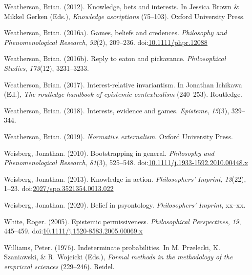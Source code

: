 \documentclass[
  10pt,
  letterpaper,
  twoside]{scrbook}
\newlength{\cslhangindent}
\newenvironment{CSLReferences}[2] %
 {\begin{list}{}{%
  \setlength{\itemindent}{0pt}
  \setlength{\leftmargin}{0pt}
  \setlength{\parsep}{0pt}
  \ifodd #1
   \setlength{\leftmargin}{\cslhangindent}
   \setlength{\itemindent}{-1\cslhangindent}
  \fi
  \setlength{\itemsep}{#2\baselineskip}}}
 {\end{list}}
\begin{document}
\begin{CSLReferences}{1}{0}
Weatherson, Brian. (2012). Knowledge, bets and interests. In Jessica
Brown \& Mikkel Gerken (Eds.), \emph{Knowledge ascriptions} (75--103).
Oxford University Press.

Weatherson, Brian. (2016a). Games, beliefs and credences.
\emph{Philosophy and Phenomenological Research}, \emph{92}(2), 209--236.
doi:\href{https://doi.org/10.1111/phpr.12088}{10.1111/phpr.12088}

Weatherson, Brian. (2016b). Reply to eaton and pickavance.
\emph{Philosophical Studies}, \emph{173}(12), 3231--3233.

Weatherson, Brian. (2017). Interest-relative invariantism. In Jonathan
Ichikawa (Ed.), \emph{The routledge handbook of epistemic contextualism}
(240--253). Routledge.

Weatherson, Brian. (2018). Interests, evidence and games.
\emph{Episteme}, \emph{15}(3), 329--344.

Weatherson, Brian. (2019). \emph{Normative externalism}. Oxford
University Press.

Weisberg, Jonathan. (2010). Bootstrapping in general. \emph{Philosophy
and Phenomenological Research}, \emph{81}(3), 525--548.
doi:\href{https://doi.org/10.1111/j.1933-1592.2010.00448.x}{10.1111/j.1933-1592.2010.00448.x}

Weisberg, Jonathan. (2013). Knowledge in action. \emph{Philosophers'
Imprint}, \emph{13}(22), 1--23.
doi:\href{https://doi.org/2027/spo.3521354.0013.022}{2027/spo.3521354.0013.022}

Weisberg, Jonathan. (2020). Belief in psyontology. \emph{Philosophers'
Imprint}, xx--xx.

White, Roger. (2005). Epistemic permissiveness. \emph{Philosophical
Perspectives}, \emph{19}, 445--459.
doi:\href{https://doi.org/10.1111/j.1520-8583.2005.00069.x}{10.1111/j.1520-8583.2005.00069.x}

Williams, Peter. (1976). Indeterminate probabilities. In M. Przelecki,
K. Szaniawski, \& R. Wojcicki (Eds.), \emph{Formal methods in the
methodology of the empriccal sciences} (229--246). Reidel.


\end{CSLReferences}
\end{document}

